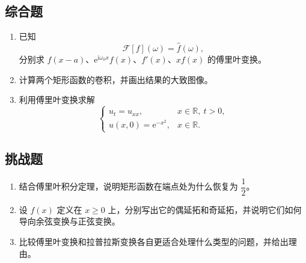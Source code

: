 \subsection*{综合题}
\begin{enumerate}
    \item 已知
    \begin{equation}
        \mathcal{F}[f](\omega)=\hat{f}(\omega),
    \end{equation}
    分别求 $f(x-a)$、$\mathrm{e}^{\mathrm{i}\omega_0 x}f(x)$、$f'(x)$、$xf(x)$ 的傅里叶变换。
    \item 计算两个矩形函数的卷积，并画出结果的大致图像。
    \item 利用傅里叶变换求解
    \begin{equation}
        \begin{cases}
            u_t=u_{xx}, & x\in\mathbb{R},\ t>0, \\
            u(x,0)=\mathrm{e}^{-x^2}, & x\in\mathbb{R}.
        \end{cases}
    \end{equation}
\end{enumerate}

\subsection*{挑战题}
\begin{enumerate}
    \item 结合傅里叶积分定理，说明矩形函数在端点处为什么恢复为 $\dfrac{1}{2}$。
    \item 设 $f(x)$ 定义在 $x\ge 0$ 上，分别写出它的偶延拓和奇延拓，并说明它们如何导向余弦变换与正弦变换。
    \item 比较傅里叶变换和拉普拉斯变换各自更适合处理什么类型的问题，并给出理由。
\end{enumerate}
